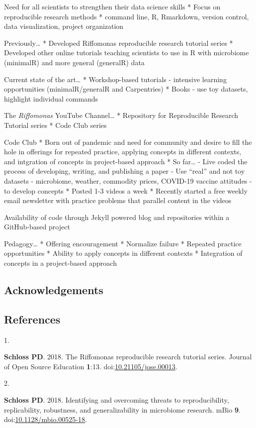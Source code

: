 \documentclass[
]{article}
\newlength{\cslhangindent}
\newlength{\csllabelwidth}
\newlength{\cslentryspacingunit} %
\newenvironment{CSLReferences}[2] %
 {%
  \setlength{\parindent}{0pt}
  \ifodd #1
  \let\oldpar\par
  \def\par{\hangindent=\cslhangindent\oldpar}
  \fi
  \setlength{\parskip}{#2\cslentryspacingunit}
 }%
 {}
\newcommand{\CSLLeftMargin}[1]{\parbox[t]{\csllabelwidth}{#1}}
\newcommand{\CSLRightInline}[1]{\parbox[t]{\linewidth - \csllabelwidth}{#1}\break}
\begin{document}
Need for all scientists to strengthen their data science skills * Focus
on reproducible research methods * command line, R, Rmarkdown, version
control, data visualization, project organization

Previously\ldots{} * Developed Riffomonas reproducible research tutorial
series * Developed other online tutorials teaching scientists to use in
R with microbiome (minimalR) and more general (generalR) data

Current state of the art\ldots{} * Workshop-based tutorials - intensive
learning opportunities (minimalR/generalR and Carpentries) * Books - use
toy datasets, highlight individual commands

The \emph{Riffomonas} YouTube Channel\ldots{} * Repository for
Reproducible Research Tutorial series * Code Club series

Code Club * Born out of pandemic and need for community and desire to
fill the hole in offerings for repeated practice, applying concepts in
different contexts, and intgration of concepts in project-based approach
* So far\ldots{} - Live coded the process of developing, writing, and
publishing a paper - Use ``real'' and not toy datasets - microbiome,
weather, commodity prices, COVID-19 vaccine attitudes - to develop
concepts * Posted 1-3 videos a week * Recently started a free weekly
email newsletter with practice problems that parallel content in the
videos

Availability of code through Jekyll powered blog and repositories within
a GitHub-based project

Pedagogy\ldots{} * Offering encouragement * Normalize failure * Repeated
practice opportunities * Ability to apply concepts in different contexts
* Integration of concepts in a project-based approach

\hypertarget{acknowledgements}{%
\subsection{Acknowledgements}\label{acknowledgements}}

\newpage

\hypertarget{references}{%
\subsection{References}\label{references}}

\hypertarget{refs}{}
\begin{CSLReferences}{0}{1}
\leavevmode{}%
\CSLLeftMargin{1. }%
\CSLRightInline{\textbf{Schloss PD}. 2018. The {R}iffomonas reproducible
research tutorial series. Journal of Open Source Education
\textbf{1}:13.
doi:\href{https://doi.org/10.21105/jose.00013}{10.21105/jose.00013}.}

\leavevmode{}%
\CSLLeftMargin{2. }%
\CSLRightInline{\textbf{Schloss PD}. 2018. Identifying and overcoming
threats to reproducibility, replicability, robustness, and
generalizability in microbiome research. {mBio} \textbf{9}.
doi:\href{https://doi.org/10.1128/mbio.00525-18}{10.1128/mbio.00525-18}.}

\end{CSLReferences}
\end{document}
